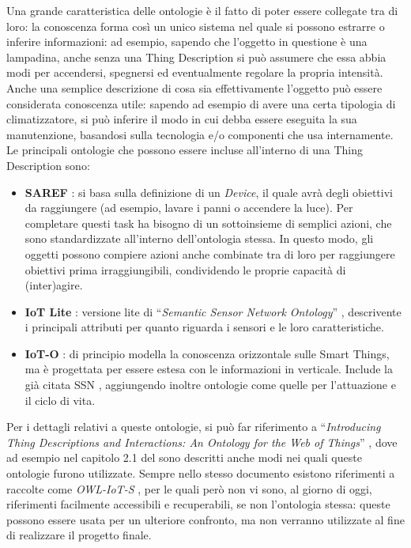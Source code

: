 \documentclass[12pt,a4paper,openright,oneside]{report}
\newcommand{\quotes}[1]{``#1''}
\begin{document}
Una grande caratteristica delle ontologie è il fatto di poter essere collegate tra di loro: la conoscenza forma così un unico sistema nel quale si possono estrarre o inferire informazioni: ad esempio, sapendo che l'oggetto in questione è una lampadina, anche senza una Thing Description si può assumere che essa abbia modi per accendersi, spegnersi ed eventualmente regolare la propria intensità. Anche una semplice descrizione di cosa sia effettivamente l'oggetto può essere considerata conoscenza utile: sapendo ad esempio di avere una certa tipologia di climatizzatore, si può inferire il modo in cui debba essere eseguita la sua manutenzione, basandosi sulla tecnologia e/o componenti che usa internamente.\\

Le principali ontologie che possono essere incluse all'interno di una Thing Description sono:
\begin{itemize}
	\item \textbf{SAREF} \cite{saref}: si basa sulla definizione di un \textit{Device}, il quale avrà degli obiettivi da raggiungere (ad esempio, lavare i panni o accendere la luce). Per completare questi task ha bisogno di un sottoinsieme di semplici azioni, che sono standardizzate all'interno dell'ontologia stessa. In questo modo, gli oggetti possono compiere azioni anche combinate tra di loro per raggiungere obiettivi prima irraggiungibili, condividendo le proprie capacità di (inter)agire.
	
	\item \textbf{IoT Lite} \cite{iot-lite}: versione lite di \quotes{\textit{Semantic Sensor Network Ontology}} \cite{ssno}, descrivente i principali attributi per quanto riguarda i sensori e le loro caratteristiche.
	
	\item \textbf{IoT-O} \cite{ioto}\cite{iot-paper}: di principio modella la conoscenza orizzontale sulle Smart Things, ma è progettata per essere estesa con le informazioni in verticale. Include la già citata SSN \cite{ssno}, aggiungendo inoltre ontologie come quelle per l'attuazione e il ciclo di vita.

\end{itemize}

Per i dettagli relativi a queste ontologie, si può far riferimento a  \quotes{\textit{Introducing Thing Descriptions and Interactions: An Ontology for the Web of Things}} \cite{td-paper2}, dove ad esempio nel capitolo 2.1 del sono descritti anche modi nei quali queste ontologie furono utilizzate. Sempre nello stesso documento esistono riferimenti a raccolte come \textit{OWL-IoT-S} \cite{owliot}, per le quali però non vi sono, al giorno di oggi, riferimenti facilmente accessibili e recuperabili, se non l'ontologia stessa: queste possono essere usata per un ulteriore confronto, ma non verranno utilizzate al fine di realizzare il progetto finale.\\
\end{document}
